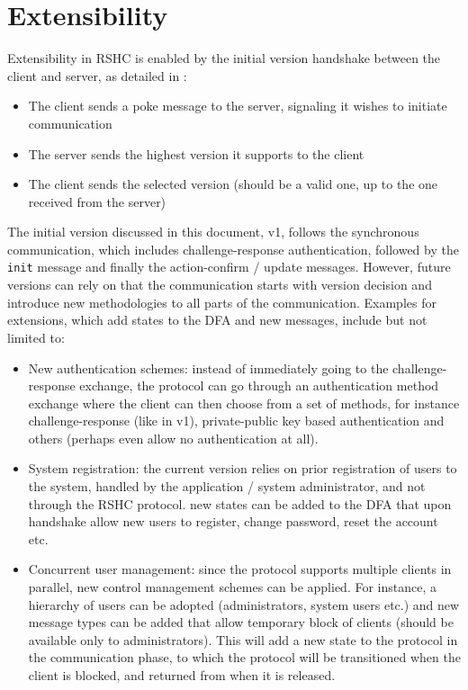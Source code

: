 \section{Extensibility}
\label{sec:extend}

Extensibility in RSHC is enabled by the initial version handshake between the client and server, as detailed in :
\begin{itemize}
\item The client sends a poke message to the server, signaling it wishes to initiate communication
\item The server sends the highest version it supports to the client
\item The client sends the selected version (should be a valid one, up to the one received from the server)
\end{itemize}

The initial version discussed in this document, v1, follows the synchronous communication, which includes challenge-response authentication, followed by the {\tt init} message and finally the action-confirm / update messages. However, future versions can rely on that the communication starts with version decision and introduce new methodologies to all parts of the communication. Examples for extensions, which add states to the DFA and new messages, include but not limited to:
\begin{itemize}
\item New authentication schemes: instead of immediately going to the challenge-response exchange, the protocol can go through an authentication method exchange where the client can then choose from a set of methods, for instance challenge-response (like in v1), private-public key based authentication and others (perhaps even allow no authentication at all).
\item System registration: the current version relies on prior registration of users to the system, handled by the application / system administrator, and not through the RSHC protocol. new states can be added to the DFA that upon handshake allow new users to register, change password, reset the account etc.
\item Concurrent user management: since the protocol supports multiple clients in parallel, new control management schemes can be applied. For instance, a hierarchy of users can be adopted (administrators, system users etc.) and new message types can be added that allow temporary block of clients (should be available only to administrators). This will add a new state to the protocol in the communication phase, to which the protocol will be transitioned when the client is blocked, and returned from when it is released.
\end{itemize}


